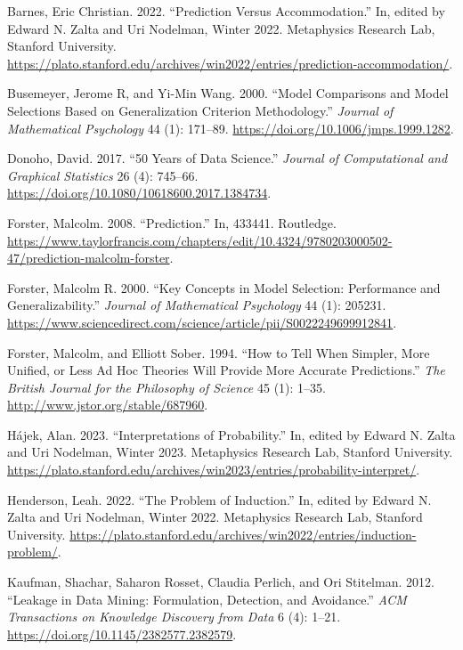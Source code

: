 \documentclass[
  letterpaper,
  DIV=11,
  numbers=noendperiod]{scrartcl}
\newlength{\cslhangindent}
\newenvironment{CSLReferences}[2] %
 {\begin{list}{}{%
  \setlength{\itemindent}{0pt}
  \setlength{\leftmargin}{0pt}
  \setlength{\parsep}{0pt}
  \ifodd #1
   \setlength{\leftmargin}{\cslhangindent}
   \setlength{\itemindent}{-1\cslhangindent}
  \fi
  \setlength{\itemsep}{#2\baselineskip}}}
 {\end{list}}
\theoremstyle{definition}
\theoremstyle{remark}
\begin{document}
\label{refs}
\begin{CSLReferences}{1}{0}
Barnes, Eric Christian. 2022. {``Prediction Versus Accommodation.''} In,
edited by Edward N. Zalta and Uri Nodelman, Winter 2022. Metaphysics
Research Lab, Stanford University.
\url{https://plato.stanford.edu/archives/win2022/entries/prediction-accommodation/}.

Busemeyer, Jerome R, and Yi-Min Wang. 2000. {``Model Comparisons and
Model Selections Based on Generalization Criterion Methodology.''}
\emph{Journal of Mathematical Psychology} 44 (1): 171--89.
\url{https://doi.org/10.1006/jmps.1999.1282}.

Donoho, David. 2017. {``50 Years of Data Science.''} \emph{Journal of
Computational and Graphical Statistics} 26 (4): 745--66.
\url{https://doi.org/10.1080/10618600.2017.1384734}.

Forster, Malcolm. 2008. {``Prediction.''} In, 433441. Routledge.
\url{https://www.taylorfrancis.com/chapters/edit/10.4324/9780203000502-47/prediction-malcolm-forster}.

Forster, Malcolm R. 2000. {``Key Concepts in Model Selection:
Performance and Generalizability.''} \emph{Journal of Mathematical
Psychology} 44 (1): 205231.
\url{https://www.sciencedirect.com/science/article/pii/S0022249699912841}.

Forster, Malcolm, and Elliott Sober. 1994. {``How to Tell When Simpler,
More Unified, or Less Ad Hoc Theories Will Provide More Accurate
Predictions.''} \emph{The British Journal for the Philosophy of Science}
45 (1): 1--35. \url{http://www.jstor.org/stable/687960}.

Hájek, Alan. 2023. {``Interpretations of Probability.''} In, edited by
Edward N. Zalta and Uri Nodelman, Winter 2023. Metaphysics Research Lab,
Stanford University.
\url{https://plato.stanford.edu/archives/win2023/entries/probability-interpret/}.

Henderson, Leah. 2022. {``The Problem of Induction.''} In, edited by
Edward N. Zalta and Uri Nodelman, Winter 2022. Metaphysics Research Lab,
Stanford University.
\url{https://plato.stanford.edu/archives/win2022/entries/induction-problem/}.

Kaufman, Shachar, Saharon Rosset, Claudia Perlich, and Ori Stitelman.
2012. {``Leakage in Data Mining: Formulation, Detection, and
Avoidance.''} \emph{ACM Transactions on Knowledge Discovery from Data} 6
(4): 1--21. \url{https://doi.org/10.1145/2382577.2382579}.


\end{CSLReferences}
\end{document}
